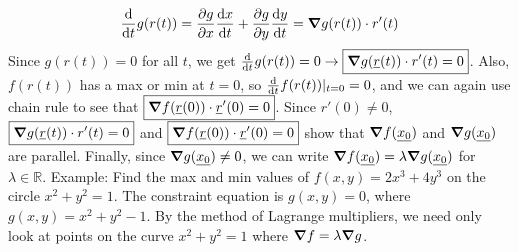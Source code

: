 \documentclass{article}
\newcommand{\n}{\leavevmode \newline} %
\newcommand{\nn}{\leavevmode \newline \newline} %
\newcommand{\R}{\mathbb{R}} %
\numberwithin{equation}{subsection} %
\begin{document}
\begin{equation}
    \dv{t} g(r(t)) = \pdv{g}{x}\dv{x}{t} + \pdv{g}{y}\dv{y}{t} = \grad g(r(t)) \cdot r'(t)
\end{equation}
\n
Since $g(r(t))=0$ for all $t$, we get $\dv{t}g(r(t))=0\to \boxed{\grad g(\underline{r}(t)) \cdot r'(t)=0}$. Also, $f(r(t))$ has a max or min at $t=0$, so $\dv{t}f(r(t))|_{t=0} = 0$, and we can again use chain rule to see that $\boxed{\grad f(\underline{r}(0)) \cdot \underline{r}'(0) = 0}$. Since $r'(0)\neq0$, $\boxed{\grad g(\underline{r}(t)) \cdot r'(t)=0}$ and $\boxed{\grad f(\underline{r}(0)) \cdot \underline{r}'(0) = 0}$ show that $\grad f(\underline{x_0})$ and $\grad g(\underline{x_0})$ are parallel. Finally, since $\grad g(\underline{x_0})\neq 0$, we can write $\grad f(\underline{x_0}) = \lambda \grad g(\underline{x_0})$ for $\lambda \in \R$.
\nn
Example: Find the max and min values of $f(x,y)=2x^3+4y^3$ on the circle $x^2+y^2=1$.
\n
The constraint equation is $g(x,y)=0$, where $g(x,y)=x^2+y^2-1$. By the method of Lagrange multipliers, we need only look at points on the curve $x^2+y^2=1$ where $\grad f = \lambda \grad g$.
\end{document}
